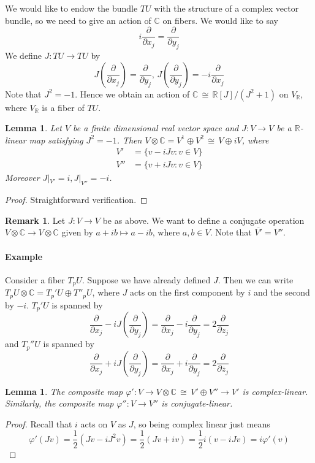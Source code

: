 \documentclass[12pt]{article}
\theoremstyle{plain}
\newtheorem{lemma}[equation]{Lemma}
\theoremstyle{definition}
\newtheorem{remark}[equation]{Remark}
\newcommand{\IC}{\mathbb{C}}
\newcommand{\IR}{\mathbb{R}}
\newcommand\iso{{\, \cong \,}}
\newcommand\tensor{{\otimes}}
\newcommand{\<}{\langle}
\renewcommand{\>}{\rangle}
\newcommand{\p}{\partial}
\newcommand{\half}{\frac{1}{2}}
\newcommand{\bz}{\overline{z}}
\newcommand{\ddzj}{\frac{\p}{\p z_j}}
\newcommand{\ddbzj}{\frac{\p}{\p \bz_j}}
\newcommand{\ddxj}{\frac{\p}{\p x_j}}
\newcommand{\ddyj}{\frac{\p}{\p y_j}}
\begin{document}
We would like to endow the bundle $TU$ with the structure of a complex vector bundle, so we need to give an action of $\IC$ on fibers. We would like to say 
$$ i \ddxj = \ddyj $$
We define $J : TU \to TU$ by 
$$ J(\ddxj) = \ddyj, \, J(\ddyj) = -i \ddxj$$
Note that $J^2 = - 1$. Hence we obtain an action of $\IC \iso \IR[J]/(J^2 + 1)$ on $V_\IR$, where $V_\IR$ is a fiber of $TU$. 

\begin{lemma}
\label{decomp}
Let $V$ be a finite dimensional real vector space and $J : V \to V$ be a $\IR$-linear map satisfying $J^2 = -1$. Then $V \tensor \IC = V^1 \oplus V^2 \iso V \oplus i V $, where 
\begin{align*}
V' &= \{ v - i J v : v \in V \} \\
V'' &= \{ v + i J v : v \in V \} 
\end{align*}
Moreover $J|_{V'} = i, J|_{V''} = - i$. 
\end{lemma}
\begin{proof}
Straightforward verification. 
\end{proof}
\begin{remark} 
Let $J : V \to V$ be as above. We want to define a conjugate operation $V \tensor \IC \to V \tensor \IC$ given by $a + i b \mapsto a - i b$, where $a, b \in V$. Note that $\overline{V'} = V''$. 
\end{remark}

\paragraph{Example} Consider a fiber $T_p U$. Suppose we have already defined $J$. Then we can write $T_p U \tensor \IC = T_p' U \oplus T''_p U$, where $J$ acts on the first component by $i$ and the second by $- i$. 
$T_p' U$ is spanned by 
$$ \ddxj - i J(\ddyj) = \ddxj - i \ddyj = 2 \ddzj $$
and $T_p'' U $ is spanned by 
$$ \ddxj + i J(\ddyj) = \ddxj + i \ddyj = 2 \ddbzj $$

\begin{lemma}
The composite map $ \varphi' : V \to V \tensor \IC \iso V' \oplus V'' \to V' $ is complex-linear. Similarly, the composite map $\varphi'' : V \to V''$ is conjugate-linear. 
\end{lemma}
\begin{proof}
Recall that $i$ acts on $V$ as $J$, so being complex linear just means 
$$ \varphi'(J v) = \half(J v - i J^2 v) = \half(J v + i v) = \half i(v - i Jv) = i \varphi'(v) $$
\end{proof}
\end{document}
